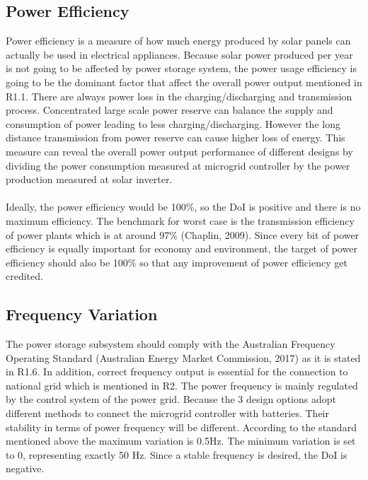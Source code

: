 \documentclass{article}
\begin{document}
\subsection{Power Efficiency}
Power efficiency is a measure of how much energy produced by solar panels can actually be used in electrical appliances. Because solar power produced per year is not going to be affected by power storage system, the power usage efficiency is going to be the dominant factor that affect the overall power output mentioned in R1.1. There are always power loss in the charging/discharging and transmission process. Concentrated large scale power reserve can balance the supply and consumption of power leading to less charging/discharging. However the long distance transmission from power reserve can cause higher loss of energy. This measure can reveal the overall power output performance of different designs by dividing the power consumption measured at microgrid controller by the power production measured at solar inverter.\\
\\Ideally, the power efficiency would be 100\%, so the DoI is positive and there is no maximum efficiency. The benchmark for worst case is the transmission efficiency of power plants which is at around 97\% (Chaplin, 2009). Since every bit of power efficiency is equally important for economy and environment, the target of power efficiency should also be 100\% so that any improvement of power efficiency get credited.
\subsection{Frequency Variation}
The power storage subsystem should comply with the Australian Frequency Operating Standard (Australian Energy Market Commission, 2017) as it is stated in R1.6. In addition, correct frequency output is essential for the connection to national grid which is mentioned in R2. The power frequency is mainly regulated by the control system of the power grid. Because the 3 design options adopt different methods to connect the microgrid controller with batteries. Their stability in terms of power frequency will be different. According to the standard mentioned above the maximum variation is 0.5Hz. The minimum variation is set to 0, representing exactly 50 Hz. Since a stable frequency is desired, the DoI is negative.
\end{document}
